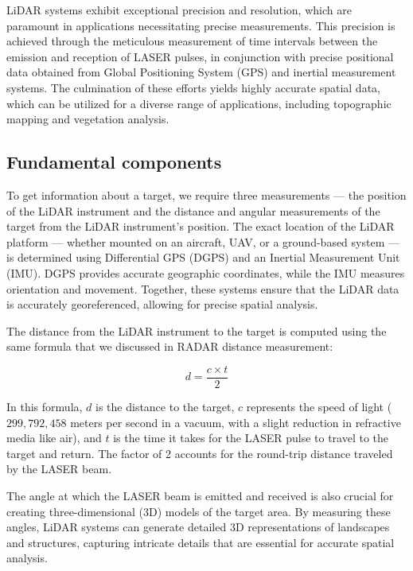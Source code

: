 \documentclass[
  12 pt,
]{Nemilov}
\begin{document}
LiDAR systems exhibit exceptional precision and resolution, which are paramount in applications necessitating precise measurements. This precision is achieved through the meticulous measurement of time intervals between the emission and reception of LASER pulses, in conjunction with precise positional data obtained from Global Positioning System (GPS) and inertial measurement systems. The culmination of these efforts yields highly accurate spatial data, which can be utilized for a diverse range of applications, including topographic mapping and vegetation analysis.

\subsection{Fundamental components}\label{fundamental-components}

To get information about a target, we require three measurements --- the position of the LiDAR instrument and the distance and angular measurements of the target from the LiDAR instrument's position. The exact location of the LiDAR platform --- whether mounted on an aircraft, UAV, or a ground-based system --- is determined using Differential GPS (DGPS) and an Inertial Measurement Unit (IMU). DGPS provides accurate geographic coordinates, while the IMU measures orientation and movement. Together, these systems ensure that the LiDAR data is accurately georeferenced, allowing for precise spatial analysis.

The distance from the LiDAR instrument to the target is computed using the same formula that we discussed in RADAR distance measurement:

\[ d = \frac{c \times t}{2} \]

In this formula, \(d\) is the distance to the target, \(c\) represents the speed of light (\(299,792,458\) meters per second in a vacuum, with a slight reduction in refractive media like air), and \(t\) is the time it takes for the LASER pulse to travel to the target and return. The factor of 2 accounts for the round-trip distance traveled by the LASER beam.

The angle at which the LASER beam is emitted and received is also crucial for creating three-dimensional (3D) models of the target area. By measuring these angles, LiDAR systems can generate detailed 3D representations of landscapes and structures, capturing intricate details that are essential for accurate spatial analysis.
\end{document}
